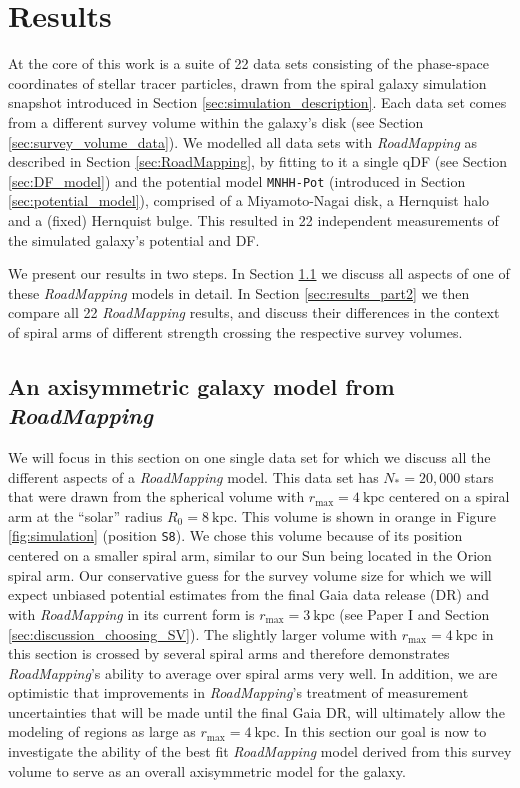 \documentclass[iop,revtex4,numberedappendix,appendixfloats]{emulateapj}
\newcommand{\RM}{{\sl RoadMapping}}
\begin{document}
\section{Results} \label{sec:results}

At the core of this work is a suite of 22 data sets consisting of the phase-space coordinates of stellar tracer particles, drawn from the spiral galaxy simulation snapshot introduced in Section \ref{sec:simulation_description}. Each data set comes from a different survey volume within the galaxy's disk (see Section \ref{sec:survey_volume_data}). We modelled all data sets with \RM{} as described in Section \ref{sec:RoadMapping}, by fitting to it a single qDF (see Section \ref{sec:DF_model}) and the potential model \texttt{MNHH-Pot} (introduced in Section \ref{sec:potential_model}), comprised of a Miyamoto-Nagai disk, a Hernquist halo and a (fixed) Hernquist bulge. This resulted in 22 independent measurements of the simulated galaxy's potential and DF.

We present our results in two steps. In Section \ref{sec:results_part1} we discuss all aspects of one of these \RM{} models in detail. In Section \ref{sec:results_part2} we then compare all 22 \RM{} results, and discuss their differences in the context of spiral arms of different strength crossing the respective survey volumes.

\subsection{An axisymmetric galaxy model from \RM{}} \label{sec:results_part1}

We will focus in this section on one single data set for which we discuss all the different aspects of a \RM{} model. This data set has $N_*=20,000$ stars that were drawn from the spherical volume with $r_\text{max}=4~\text{kpc}$ centered on a spiral arm at the ``solar'' radius $R_0=8~\text{kpc}$. This volume is shown in orange in Figure \ref{fig:simulation} (position \texttt{S8}). We chose this volume because of its position centered on a smaller spiral arm, similar to our Sun being located in the Orion spiral arm. Our conservative guess for the survey volume size for which we will expect unbiased potential estimates from the final Gaia data release (DR) and with \RM{} in its current form is $r_\text{max}=3~\text{kpc}$ (see Paper I and Section \ref{sec:discussion_choosing_SV}). The slightly larger volume with $r_\text{max}=4~\text{kpc}$ in this section is crossed by several spiral arms and therefore demonstrates \RM{}'s ability to average over spiral arms very well. In addition, we are optimistic that improvements in \RM{}'s treatment of measurement uncertainties that will be made until the final Gaia DR, will ultimately allow the modeling of regions as large as $r_\text{max}=4~\text{kpc}$. In this section our goal is now to investigate the ability of the best fit \RM{} model derived from this survey volume to serve as an overall axisymmetric model for the galaxy.
\end{document}
